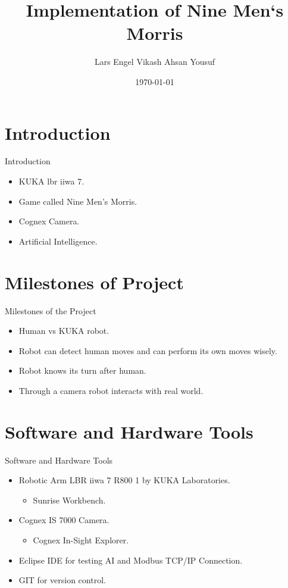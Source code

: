 \documentclass{beamer}
\title{Implementation of Nine Men`s Morris}
\author{Lars Engel \newline Vikash \newline Ahsan Yousuf}
\institute{Fachhochschule Kiel}
\date{\today}
\begin{document}

\begin{frame}
\titlepage
\end{frame}


\section{Introduction}
\begin{frame}{Introduction }
\begin{itemize}
\item KUKA lbr iiwa 7.
\item Game called Nine Men's Morris.
\item Cognex Camera.
\item Artificial Intelligence.
\end{itemize}
\end{frame}

\section{Milestones of Project}
\begin{frame}{Milestones of the Project}
\begin{itemize}
\item Human vs KUKA robot.  
\item Robot can detect human moves and can perform its own moves wisely.
\item Robot knows its turn after human.
\item Through a camera robot interacts with real world.
\end{itemize}
\end{frame}

\section{Software and Hardware Tools}
\begin{frame}{Software and Hardware Tools}
\begin{itemize}
\item Robotic Arm LBR iiwa 7 R800 1 by KUKA Laboratories.
\begin{itemize}
\item Sunrise Workbench.
\end{itemize}
\item Cognex IS 7000 Camera.
\begin{itemize}
\item Cognex In-Sight Explorer.
\end{itemize}
\vspace{\baselineskip}
\item Eclipse IDE for testing AI and Modbus TCP/IP Connection.
\item GIT for version control.
\end{itemize}
\end{frame}
\end{document}
